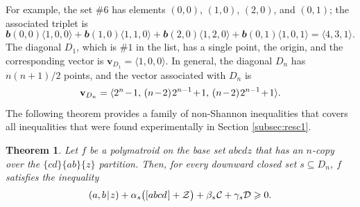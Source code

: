 \documentclass[reqno]{amsart}
\newtheorem{theorem}{Theorem}
\theoremstyle{definition}
\newcommand\tsp{\mkern 1.5mu}
\def\|{\mkern1.5mu{|}\mkern1.5mu}
\renewcommand\ge{\geqslant}\renewcommand\le{\leqslant}
\newcommand\C{\mathcal C}
\newcommand\D{\mathcal D}
\newcommand\Z{\mathcal Z} %
\def\<{\langle}\def\>{\rangle}
\def\b{\mathbfit b}
\def\m#1{\tsp{#1}\tsp}
\def\abcd{[abcd\tsp]}
\begin{document}
For example, the set $\#6$ has elements $(0,0)$, $(1,0)$, $(2,0)$, and
$(0,1)$; the associated triplet is
$$
  \b(0,0)\<1,0,0\> +
\b(1,0)\<1,1,0\>+\b(2,0)\<1,2,0\>+\b(0,1)\<1,0,1\> =\<4,3,1\>.
$$
The diagonal $D_1$, which is $\#1$ in the list, has a single point, the
origin, and the corresponding vector is $\mathbf v_{D_1}=\<1,0,0\>$. In
general, the diagonal $D_n$ has $n(n+1)/2$ points, and the vector associated
with $D_n$ is
$$
\mathbf v_{D_n} =  \< 2^n\m-1,\,(n\m-2)\tsp 2^{n-1}\m+1,\, (n\m-2)\tsp 2^{n-1}\m+1\>.
$$
The following theorem provides a family of non-Shannon inequalities that
covers all inequalities that were found experimentally in Section
\ref{subsec:resc1}.

\begin{theorem}\label{thm:mainI}
Let $f$ be a polymatroid on the base set $abcdz$ that has an $n$-copy over
the $\{cd\}\{ab\}\{z\}$ partition. Then, for every downward closed set
$s\subseteq D_n$, $f$ satisfies the inequality
\begin{equation}\label{eq:main}
  (a,b\|z) + \alpha_s\big(\abcd + \Z\big) +
           \beta_s\tsp\C + \gamma_s\D \ge 0.
\end{equation}
\end{theorem}
\end{document}
